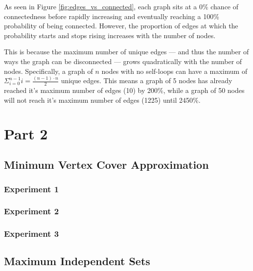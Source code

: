 \documentclass[titlepage]{article}
\begin{document}

As seen in Figure \ref{fig:edges_vs_connected}, each graph sits at a 0\% chance of connectedness before rapidly increasing and eventually reaching a 100\% probability of being connected. However, the proportion of edges at which the probability starts and stops rising increases with the number of nodes.

This is because the maximum number of unique edges --- and thus the number of ways the graph can be disconnected --- grows quadratically with the number of nodes. Specifically, a graph of $n$ nodes with no self-loops can have a maximum of $\Sigma_{i=0}^{n-1}i = \frac{(n - 1) \cdot n}{2}$ unique edges. This means a graph of 5 nodes has already reached it's maximum number of edges (10) by 200\%, while a graph of 50 nodes will not reach it's maximum number of edges (1225) until 2450\%.

\section{Part 2}

\subsection{Minimum Vertex Cover Approximation}

\subsubsection{Experiment 1}



\subsubsection{Experiment 2}



\subsubsection{Experiment 3}



\subsection{Maximum Independent Sets}
\end{document}
